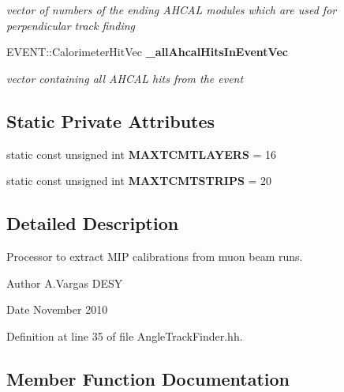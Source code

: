 \begin{DoxyCompactItemize}
\begin{DoxyCompactList}\small\item\em vector of numbers of the ending A\-H\-C\-A\-L modules which are used for perpendicular track finding \end{DoxyCompactList}\item 
E\-V\-E\-N\-T\-::\-Calorimeter\-Hit\-Vec {\bf \-\_\-all\-Ahcal\-Hits\-In\-Event\-Vec}\label{classCALICE_1_1AngleTrackFinder_aef20f858c612a3181537606fdc4be0f1}

\begin{DoxyCompactList}\small\item\em vector containing all A\-H\-C\-A\-L hits from the event \end{DoxyCompactList}\end{DoxyCompactItemize}
\subsection*{Static Private Attributes}
\begin{DoxyCompactItemize}
\item 
static const unsigned int {\bfseries M\-A\-X\-T\-C\-M\-T\-L\-A\-Y\-E\-R\-S} = 16\label{classCALICE_1_1AngleTrackFinder_a42ed04f962d4a3564dbcb4811cd4f21b}

\item 
static const unsigned int {\bfseries M\-A\-X\-T\-C\-M\-T\-S\-T\-R\-I\-P\-S} = 20\label{classCALICE_1_1AngleTrackFinder_ad99874d9a4bd40c23336a9740c34bb23}

\end{DoxyCompactItemize}


\subsection{Detailed Description}
Processor to extract M\-I\-P calibrations from muon beam runs. 

\begin{DoxyAuthor}{Author}
A.\-Vargas D\-E\-S\-Y 
\end{DoxyAuthor}
\begin{DoxyDate}{Date}
November 2010 
\end{DoxyDate}


Definition at line 35 of file Angle\-Track\-Finder.\-hh.



\subsection{Member Function Documentation}
